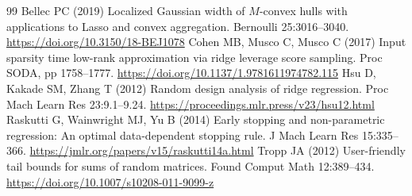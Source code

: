 \documentclass[pdflatex,sn-mathphys-ay]{sn-jnl}
\theoremstyle{remark}\newtheorem{remark}[theorem]{Remark}
\begin{document}
\begin{thebibliography}{99}
 Bellec PC (2019) Localized Gaussian width of $M$-convex hulls with applications to Lasso and convex aggregation. Bernoulli 25:3016--3040. \url{https://doi.org/10.3150/18-BEJ1078}
 Cohen MB, Musco C, Musco C (2017) Input sparsity time low-rank approximation via ridge leverage score sampling. Proc SODA, pp 1758--1777. \url{https://doi.org/10.1137/1.9781611974782.115}
 Hsu D, Kakade SM, Zhang T (2012) Random design analysis of ridge regression. Proc Mach Learn Res 23:9.1--9.24. \url{https://proceedings.mlr.press/v23/hsu12.html}
 Raskutti G, Wainwright MJ, Yu B (2014) Early stopping and non-parametric regression: An optimal data-dependent stopping rule. J Mach Learn Res 15:335--366. \url{https://jmlr.org/papers/v15/raskutti14a.html}
 Tropp JA (2012) User-friendly tail bounds for sums of random matrices. Found Comput Math 12:389--434. \url{https://doi.org/10.1007/s10208-011-9099-z}
\end{thebibliography}
\end{document}
